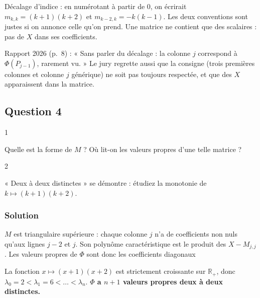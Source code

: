 \documentclass[11pt,a4paper]{article}
\newcommand{\equationajustee}[1]{%
  \sbox{\boiteequation}{$\displaystyle #1$}%
  \ifdim\wd\boiteequation>\linewidth
    \[\resizebox{\linewidth}{!}{\usebox{\boiteequation}}\]%
  \else
    \[#1\]%
  \fi}
\begin{document}
\begin{piege}

Décalage d'indice : en numérotant à partir de \(0\), on écrirait \(m_{k,k}=(k+1)(k+2)\) et \(m_{k-2,k}=-k(k-1)\). Les deux conventions sont justes si on annonce celle qu'on prend. Une matrice ne contient que des scalaires : pas de \(X\) dans ses coefficients.

\end{piege}

\begin{jury}

Rapport 2026 (p.~8) : « Sans parler du décalage : la colonne \(j\) correspond à \(\Phi(P_{j-1})\), rarement vu. » Le jury regrette aussi que la consigne (trois premières colonnes et colonne \(j\) générique) ne soit pas toujours respectée, et que des \(X\) apparaissent dans la matrice.

\end{jury}

\hypertarget{question-4}{%
\subsection{Question 4}\label{question-4}}

\begin{indication}{1}

Quelle est la forme de \(M\) ? Où lit-on les valeurs propres d'une telle matrice ?

\end{indication}

\begin{indication}{2}

« Deux à deux distinctes » se démontre : étudiez la monotonie de \(k\mapsto(k+1)(k+2)\).

\end{indication}

\hypertarget{solution-23}{%
\subsubsection{Solution}\label{solution-23}}

\(M\) est triangulaire supérieure : chaque colonne \(j\) n'a de coefficients non nuls qu'aux lignes \(j-2\) et \(j\). Son polynôme caractéristique est le produit des \(X-M_{j,j}\). Les valeurs propres de \(\Phi\) sont donc les coefficients diagonaux

\equationajustee{\lambda_k=(k+1)(k+2),\qquad k\in[\![0,n]\!].}

La fonction \(x\mapsto(x+1)(x+2)\) est strictement croissante sur \(\mathbb R_+\), donc \(\lambda_0=2<\lambda_1=6<\dots<\lambda_n\). \textbf{\(\Phi\) a \(n+1\) valeurs propres deux à deux distinctes.}
\end{document}
